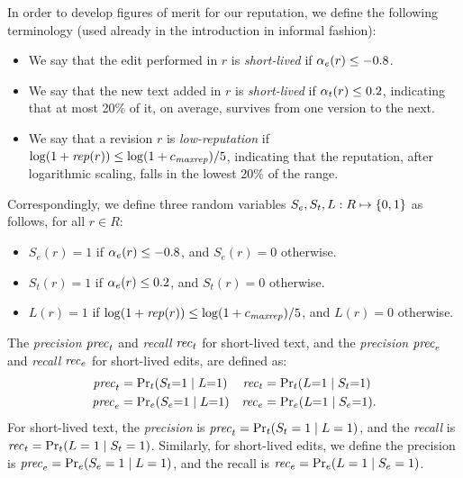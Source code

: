 In order to develop figures of merit for our reputation, we define the
following terminology (used already in the introduction in informal
fashion):
%
\begin{itemize} 

\item We say that the edit performed in $r$ is {\em short-lived\/} if
  $\alpha_e(r) \leq -0.8$.

\item We say that the new text added in $r$ is {\em short-lived\/}
  if $\alpha_t(r) \leq 0.2$, indicating that at most 20\% of it, on
  average, survives from one version to the next. 

\item We say that a revision $r$ is {\em low-reputation\/} if
  $\log (1+{\text{\textit{rep}}}(r)) \leq \log(1+{c_{{\text{\textit{maxrep}}}}}) / 5$, indicating that
  the reputation, after logarithmic scaling, falls in the lowest 20\% of
  the range. 

\end{itemize}
%
Correspondingly, we define three random variables $S_e, S_t, L: R
\mapsto \left\{0,1\right\}$ as follows, for all $r \in R$: 
%
\begin{itemize} 

\item $S_e(r)=1$ if $\alpha_e(r) \leq -0.8$, and $S_e(r)=0$ otherwise.
\item $S_t(r)=1$ if $\alpha_e(r) \leq  0.2$, and $S_t(r)=0$ otherwise.
\item $L(r)=1$ if $\log (1+{\text{\textit{rep}}}(r)) \leq \log(1+{c_{{\text{\textit{maxrep}}}}}) / 5$,
  and $L(r)=0$ otherwise.

\end{itemize}
%
\iflong
The {\em precision\/} ${\text{\textit{prec}}}_t$ and {\em recall\/} ${\text{\textit{rec}}}_t$
for short-lived text, and 
the {\em precision\/} ${\text{\textit{prec}}}_e$ and {\em recall\/} ${\text{\textit{rec}}}_e$
for short-lived edits, are defined as:
%
\begin{align*}
    {\text{\textit{prec}}}_t & = \textstyle\Pr_t(S_t{=}1 \mid L{=}1) 
  & {\text{\textit{rec}}}_t & = \textstyle\Pr_t(L{=}1 \mid S_t{=}1) \\
    {\text{\textit{prec}}}_e & = \textstyle\Pr_e(S_e{=}1 \mid L{=}1) 
  & {\text{\textit{rec}}}_e & = \textstyle\Pr_e(L{=}1 \mid S_e{=}1).
\end{align*}
\fi
\ifshort
For short-lived text, the {\em precision\/} is 
$
  \textstyle {\text{\textit{prec}}}_t = \Pr_t(S_t=1 \mid L=1)
$,
and the {\em recall\/} is 
$
  \textstyle {\text{\textit{rec}}}_t = \Pr_t(L=1 \mid S_t=1)
$.
Similarly, for short-lived edits, we define the 
precision is ${\text{\textit{prec}}}_e = \Pr_e(S_e=1 \mid L=1)$, 
and the recall is ${\text{\textit{rec}}}_e = \Pr_e(L=1 \mid S_e=1)$.
